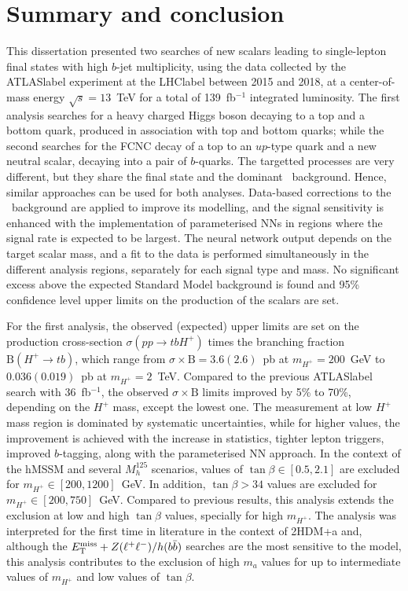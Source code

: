 \chapter{Summary and conclusion}

This dissertation presented two searches of new scalars leading to single-lepton final states with high $b$-jet multiplicity, using the data collected by the \acrshort{ATLASlabel} experiment at the \acrshort{LHClabel} between 2015 and 2018, at a center-of-mass energy $\sqrt{s}=13$~TeV for a total of 139~fb$^{-1}$ integrated luminosity. The first analysis searches for a heavy charged Higgs boson decaying to a top and a bottom quark, produced in association with top and bottom quarks; while the second searches for the FCNC decay of a top to an $up$-type quark and a new neutral scalar, decaying into a pair of $b$-quarks. The targetted processes are very different, but they share the final state and the dominant \ttjets\ background. Hence, similar approaches can be used for both analyses. Data-based corrections to the \ttbar\ background are applied to improve its modelling, and the signal sensitivity is enhanced with the implementation of parameterised NNs in regions where the signal rate is expected to be largest. The neural network output depends on the target scalar mass, and a fit to the data is performed simultaneously in the different analysis regions, separately for each signal type and mass. No significant excess above the expected Standard Model background is found and 95\% confidence level upper limits on the production of the scalars are set.

For the first analysis, the observed (expected) upper limits are set on the production cross-section $\sigma(pp\to tb H^+)$ times the branching fraction $\text{B}(H^+\to tb)$, which range from $\sigma\times\text{B}=3.6(2.6)$~pb at $m_{H^+}=200$~GeV to $0.036(0.019)$~pb at $m_{H^+}=2$~TeV. Compared to the previous \acrshort{ATLASlabel} search with 36~fb$^{-1}$, the observed $\sigma\times\text{B}$ limits improved by 5\% to 70\%, depending on the $H^+$ mass, except the lowest one. The measurement at low $H^+$ mass region is dominated by systematic uncertainties, while for higher values, the improvement is achieved with the increase in statistics, tighter lepton triggers, improved $b$-tagging, along with the parameterised NN approach. In the context of the hMSSM and several $M_{h}^{125}$ scenarios, values of $\tan\beta\in[0.5,2.1]$ are excluded for $m_{H^+}\in[200,1200]$~GeV. In addition, $\tan\beta>34$ values are excluded for $m_{H^+}\in[200,750]$~GeV. Compared to previous results, this analysis extends the exclusion at low and high $\tan\beta$ values, specially for high $m_{H^+}$. The analysis was interpreted for the first time in literature in the context of 2HDM+a and, although the $E_{\text{T}}^{\text{miss}}+Z(\ell^+\ell^-)/h(b\bar{b})$ searches are the most sensitive to the model, this analysis contributes to the exclusion of high $m_a$ values for up to intermediate values of $m_{H^+}$ and low values of $\tan\beta$.

